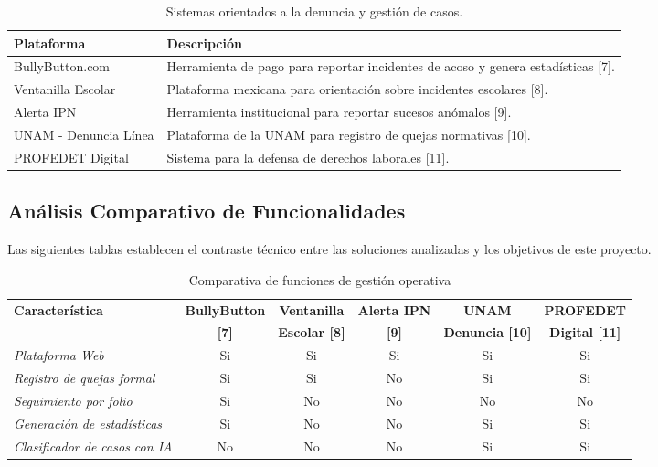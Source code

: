 \begin{table}[htbp]
\centering %
\small
\begin{tabular}{|l|p{10cm}|}
\hline
\textbf{Plataforma} & \textbf{Descripción} \\ \hline
BullyButton.com & Herramienta de pago para reportar incidentes de acoso y genera estadísticas [7]. \\ \hline
Ventanilla Escolar & Plataforma mexicana para orientación sobre incidentes escolares [8]. \\ \hline
Alerta IPN & Herramienta institucional para reportar sucesos anómalos [9]. \\ \hline
UNAM - Denuncia Línea & Plataforma de la UNAM para registro de quejas normativas [10]. \\ \hline
PROFEDET Digital & Sistema para la defensa de derechos laborales [11]. \\ \hline
\end{tabular}
\caption{Sistemas orientados a la denuncia y gestión de casos.}
\end{table}

\newpage
\subsection{Análisis Comparativo de Funcionalidades}
Las siguientes tablas establecen el contraste técnico entre las soluciones analizadas y los objetivos de este proyecto.

\begin{table}[htbp]
\centering
\small
\begin{tabular}{|p{3.5cm}|c|c|c|c|c|}
\hline
\textbf{Característica} & \textbf{BullyButton} & \textbf{Ventanilla} & \textbf{Alerta IPN} & \textbf{UNAM} & \textbf{PROFEDET} \\
& \textbf{[7]} & \textbf{Escolar [8]} & \textbf{[9]} & \textbf{Denuncia [10]} & \textbf{Digital [11]} \\ \hline
\textit{Plataforma Web} & Si & Si & Si & Si & Si \\ \hline
\textit{Registro de quejas formal} & Si & Si & No & Si & Si \\ \hline
\textit{Seguimiento por folio} & Si & No & No & No & No \\ \hline
\textit{Generación de estadísticas} & Si & No & No & Si & Si \\ \hline
\textit{Clasificador de casos con IA} & No & No & No & Si & Si \\ \hline
\end{tabular}
\caption{Comparativa de funciones de gestión operativa}
\end{table}

